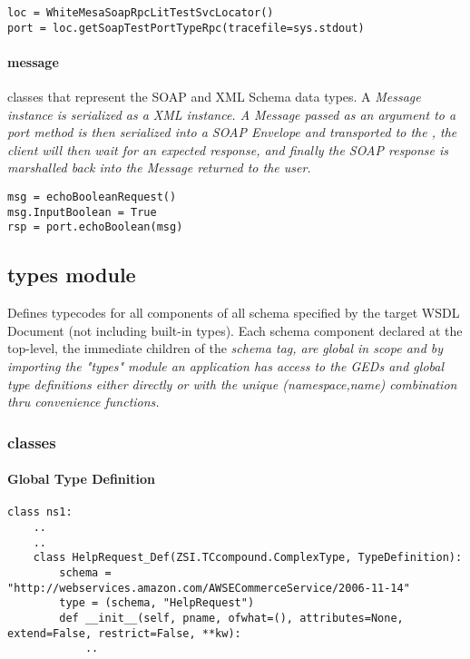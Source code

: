 \begin{verbatim}
loc = WhiteMesaSoapRpcLitTestSvcLocator()
port = loc.getSoapTestPortTypeRpc(tracefile=sys.stdout)
\end{verbatim}


\paragraph{message} classes that represent the SOAP and XML Schema
data types. A \it{Message} instance is serialized as a XML instance.  A
\it{Message} passed as an argument to a \it{port} method is then serialized into
a SOAP Envelope and transported to the \WS, the client will then wait for an
expected response, and finally the SOAP response is marshalled back into the
\it{Message} returned to the user.

\begin{verbatim}
msg = echoBooleanRequest()
msg.InputBoolean = True
rsp = port.echoBoolean(msg)
\end{verbatim}

\subsection{types module}
Defines typecodes for all components of all schema specified by the target WSDL
Document (not including built-in types).  Each schema component declared at the
top-level, the immediate children of the \it{schema} tag, are global in scope
and by importing the "types" module an application has access to the GEDs and
global type definitions either directly or with the unique  
\it{(namespace,name)} combination thru convenience functions.

\subsubsection{classes}
\paragraph{Global Type Definition}
\begin{verbatim}
class ns1:
    ..
    ..
    class HelpRequest_Def(ZSI.TCcompound.ComplexType, TypeDefinition):
        schema = "http://webservices.amazon.com/AWSECommerceService/2006-11-14"
        type = (schema, "HelpRequest")
        def __init__(self, pname, ofwhat=(), attributes=None, extend=False, restrict=False, **kw):
            ..
\end{verbatim}
\par


